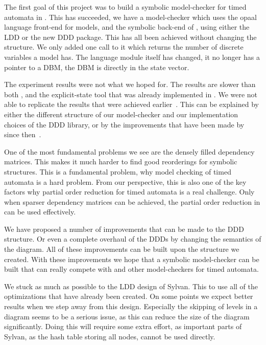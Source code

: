 The first goal of this project was to build a symbolic model-checker for timed automata in \ltsmin{}. This has succeeded, we have a model-checker which uses the opaal language front-end for \uppaal{} models, and the symbolic back-end of \ltsmin{}, using either the LDD or the new DDD package. This has all been achieved without changing the \pins{} structure. We only added one call to it which returns the number of discrete variables a model has. The language module itself has changed, it no longer has a pointer to a DBM, the DBM is directly in the state vector. 

The experiment results were not what we hoped for. The results are slower than both \uppaal{}, and the explicit-state tool that was already implemented in \ltsmin{}. We were not able to replicate the results that were achieved earlier~\cite{ddds}. This can be explained by either the different structure of our model-checker and our implementation choices of the DDD library, or by the improvements that have been made by \uppaal{} since then~\cite{bbdlpw-ftrtft02}. 

One of the most fundamental problems we see are the densely filled dependency matrices. This makes it much harder to find good reorderings for symbolic structures. This is a fundamental problem, why model checking of timed automata is a hard problem. From our perspective, this is also one of the key factors why partial order reduction for timed automata is a real challenge. Only when sparser dependency matrices can be achieved, the partial order reduction in \ltsmin{} can be used effectively. 

We have proposed a number of improvements that can be made to the DDD structure. Or even a complete overhaul of the DDDs by changing the semantics of the diagram. All of these improvements can be built upon the structure we created. With these improvements we hope that a symbolic model-checker can be built that can really compete with \uppaal{} and other model-checkers for timed automata. 

We stuck as much as possible to the LDD design of Sylvan. This to use all of the optimizations that have already been created. On some points we expect better results when we step away from this design. Especially the skipping of levels in a diagram seems to be a serious issue, as this can reduce the size of the diagram significantly. Doing this will require some extra effort, as important parts of Sylvan, as the hash table storing all nodes, cannot be used directly. 

